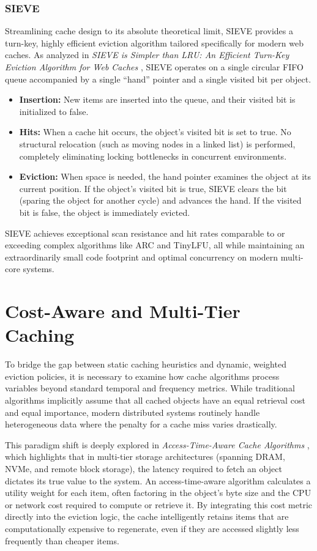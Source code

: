 \subsubsection{SIEVE}
Streamlining cache design to its absolute theoretical limit, SIEVE provides a turn-key, highly efficient eviction algorithm tailored specifically for modern web caches. As analyzed in \textit{SIEVE is Simpler than LRU: An Efficient Turn-Key Eviction Algorithm for Web Caches} \cite{zhang_sieve_2024}, SIEVE operates on a single circular FIFO queue accompanied by a single ``hand'' pointer and a single visited bit per object.

\begin{itemize}
    \item \textbf{Insertion:} New items are inserted into the queue, and their visited bit is initialized to false.
    \item \textbf{Hits:} When a cache hit occurs, the object's visited bit is set to true. No structural relocation (such as moving nodes in a linked list) is performed, completely eliminating locking bottlenecks in concurrent environments.
    \item \textbf{Eviction:} When space is needed, the hand pointer examines the object at its current position. If the object's visited bit is true, SIEVE clears the bit (sparing the object for another cycle) and advances the hand. If the visited bit is false, the object is immediately evicted.
\end{itemize}
SIEVE achieves exceptional scan resistance and hit rates comparable to or exceeding complex algorithms like ARC and TinyLFU, all while maintaining an extraordinarily small code footprint and optimal concurrency on modern multi-core systems.

\section{Cost-Aware and Multi-Tier Caching}
To bridge the gap between static caching heuristics and dynamic, weighted eviction policies, it is necessary to examine how cache algorithms process variables beyond standard temporal and frequency metrics. While traditional algorithms implicitly assume that all cached objects have an equal retrieval cost and equal importance, modern distributed systems routinely handle heterogeneous data where the penalty for a cache miss varies drastically.

This paradigm shift is deeply explored in \textit{Access-Time-Aware Cache Algorithms} \cite{neglia_access-time-aware_2017}, which highlights that in multi-tier storage architectures (spanning DRAM, NVMe, and remote block storage), the latency required to fetch an object dictates its true value to the system. An access-time-aware algorithm calculates a utility weight for each item, often factoring in the object's byte size and the CPU or network cost required to compute or retrieve it. By integrating this cost metric directly into the eviction logic, the cache intelligently retains items that are computationally expensive to regenerate, even if they are accessed slightly less frequently than cheaper items.


